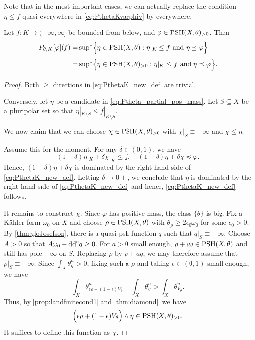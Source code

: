 Note that in the most important cases, we can actually replace the condition $\eta\leq f$ quasi-everywhere in \eqref{eq:PthetaKvarphiv} by everywhere.
\begin{lemma}\label{lma:PKoutsidepps}
    Let $f\colon K\rightarrow (-\infty,\infty]$ be bounded from below, and $\varphi\in \mathrm{PSH}(X,\theta)_{>0}$.
    Then
    \begin{equation}\label{eq:PthetaK_new_def}
        \begin{split}
    P_{\theta,K}[\varphi](f)=&\operatorname*{sup}_{}{}\!{}^{*} \Bigl\{ \eta \in \mathrm{PSH}(X,\theta): \eta|_K \leq f  \textup{ and } \eta\preceq \varphi\Bigr\}\\
    =& \operatorname*{sup}_{}{}\!{}^{*} \Bigl\{ \eta \in \mathrm{PSH}(X,\theta)_{>0}: \eta|_K \leq f  \textup{ and } \eta\preceq \varphi\Bigr\}.
        \end{split}
    \end{equation}
\end{lemma}
\begin{proof}
Both $\geq$ directions in \eqref{eq:PthetaK_new_def} are trivial.

Conversely, let $\eta$ be a candidate in \eqref{eq:Ptheta_partial_pos_mass}.
Let $S\subseteq X$ be a pluripolar set so that $\eta|_{K\setminus S}\leq f|_{K\setminus S}$.

We now claim that we can choose $\chi\in \mathrm{PSH}(X,\theta)_{>0}$ with $\chi|_S\equiv -\infty$ and $\chi\leq \eta$.

Assume this for the moment. For any $\delta\in (0,1)$, we have
\[
(1-\delta)\eta|_K+\delta \chi|_K\leq f,\quad (1-\delta)\eta+\delta \chi\preceq \varphi.
\]
Hence, $(1-\delta)\eta+\delta \chi$ is dominated by the right-hand side of \eqref{eq:PthetaK_new_def}.
Letting $\delta \to 0+$, we conclude that $\eta$ is dominated by the right-hand side of \eqref{eq:PthetaK_new_def} and hence, \eqref{eq:PthetaK_new_def} follows.

    It remains to construct $\chi$.
    Since $\varphi$ has positive mass, the class $\{\theta\}$ is big. Fix a K\"ahler form $\omega_0$ on $X$ and choose $\rho\in \mathrm{PSH}(X,\theta)$ with $\theta_{\rho}\geq 2\epsilon_0\omega_0$ for some $\epsilon_0>0$. By \cref{thm:gloJosefson}, there is a quasi-psh function $q$ such that $q|_S\equiv -\infty$. Choose $A>0$ so that $A\omega_0+\mathrm{dd}^{\mathrm{c}} q\geq 0$. For $a>0$ small enough, $\rho+aq\in \mathrm{PSH}(X,\theta)$ and still has pole $-\infty$ on $S$. Replacing $\rho$ by $\rho+aq$, we may therefore assume that $\rho|_S\equiv -\infty$.
    Since $\int_X \theta_{\eta}^n>0$, fixing such a $\rho$ and taking $\epsilon\in (0,1)$ small enough, we have
    \[
    \int_X \theta^n_{\epsilon \rho+(1-\epsilon)V_{\theta}}+\int_X \theta_{\eta}^n>\int_X \theta_{V_{\theta}}^n.
    \]
    Thus, by \cref{prop:landfinitecond1} and \cref{thm:diamond}, we have
    \[
    \Bigl(\epsilon \rho+(1-\epsilon)V_{\theta}\Bigr) \land \eta \in \mathrm{PSH}(X,\theta)_{>0}.
    \]
    It suffices to define this function as $\chi$.
\end{proof}
